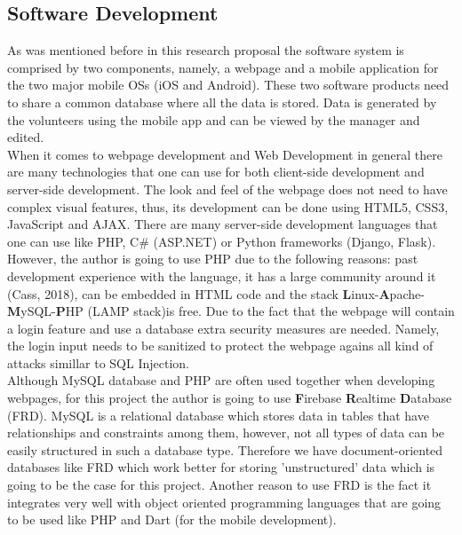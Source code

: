 \documentclass[version=last,fontsize=13pt]{scrartcl}
\begin{document}
\subsection{Software Development}
 	As was mentioned before in this research proposal the software system is comprised by two components, namely, a webpage and a mobile application for the two major mobile OSs (iOS and Android). These two software products need to share a common database where all the data is stored. Data is generated by the volunteers using the mobile app and can be viewed by the manager and edited.\\
	\indent
	When it comes to webpage development and Web Development in general there are many technologies that one can use for both client-side development and server-side development. The look and feel of the webpage does not need to have complex visual features, thus, its development can be done using HTML5, CSS3, JavaScript and AJAX. There are many server-side development languages that one can use like PHP, C\# (ASP.NET) or Python frameworks (Django, Flask). However, the author is going to use PHP due to the following reasons: past development experience with the language, it has a large community around it (Cass, 2018), can be embedded in HTML code and the stack \textbf{L}inux-\textbf{A}pache-\textbf{M}ySQL-\textbf{P}HP (LAMP stack)is free. Due to the fact that the webpage will contain a login feature and use a database extra security measures are needed. Namely, the login input needs to be sanitized to protect the webpage agains all kind of attacks simillar to  SQL Injection.\\ 
	\indent
	Although MySQL database and PHP are often used together when developing webpages, for this project the author is going to use \textbf{F}irebase \textbf{R}ealtime \textbf{D}atabase (FRD). MySQL is a relational database which stores data in tables that have relationships and constraints among them, however, not all types of data can be easily structured in such a database type. Therefore we have document-oriented databases like FRD which work better for storing 'unstructured' data which is going to be the case for this project. Another reason to use FRD is the fact it integrates very well with object oriented programming languages that are going to be used like PHP and Dart (for the mobile development).\\ 
	\indent
\end{document}
